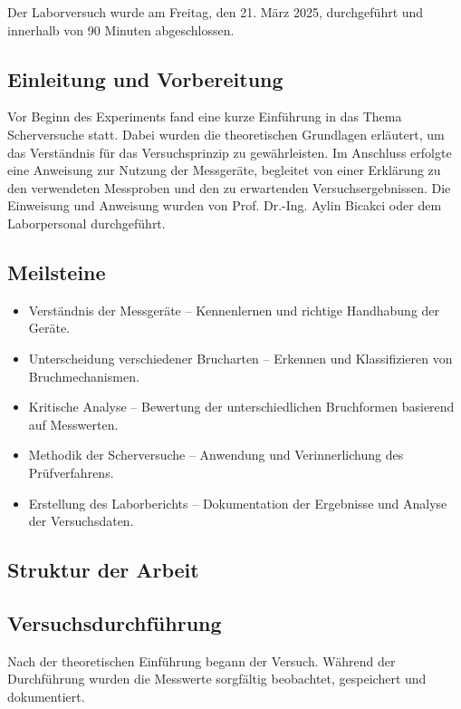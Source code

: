 Der Laborversuch wurde am Freitag, den 21. März 2025, durchgeführt und innerhalb von 90 Minuten abgeschlossen.
\subsection{Einleitung und Vorbereitung}
Vor Beginn des Experiments fand eine kurze Einführung in das Thema Scherversuche statt. Dabei wurden die theoretischen Grundlagen erläutert, um das Verständnis für das Versuchsprinzip zu gewährleisten.
Im Anschluss erfolgte eine Anweisung zur Nutzung der Messgeräte, begleitet von einer Erklärung zu den verwendeten Messproben und den zu erwartenden Versuchsergebnissen.
Die Einweisung und Anweisung wurden von Prof. Dr.-Ing. Aylin Bicakci oder dem Laborpersonal durchgeführt.
\subsection{Meilsteine}
\begin{itemize}
    \item Verständnis der Messgeräte – Kennenlernen und richtige Handhabung der Geräte.
    \item Unterscheidung verschiedener Brucharten – Erkennen und Klassifizieren von Bruchmechanismen.
    \item Kritische Analyse – Bewertung der unterschiedlichen Bruchformen basierend auf Messwerten.
    \item Methodik der Scherversuche – Anwendung und Verinnerlichung des Prüfverfahrens.
    \item Erstellung des Laborberichts – Dokumentation der Ergebnisse und Analyse der Versuchsdaten.
\end{itemize}
\subsection{Struktur der Arbeit}
\subsection{Versuchsdurchführung}
Nach der theoretischen Einführung begann der Versuch. Während der Durchführung wurden die Messwerte sorgfältig beobachtet, gespeichert und dokumentiert.
